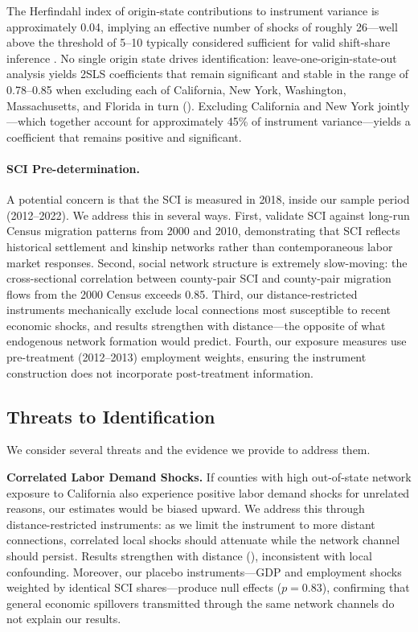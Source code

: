 \documentclass[12pt]{article}
\begin{document}
The Herfindahl index of origin-state contributions to instrument variance is approximately 0.04, implying an effective number of shocks of roughly 26---well above the threshold of 5--10 typically considered sufficient for valid shift-share inference \citep{borusyak2022quasi}. No single origin state drives identification: leave-one-origin-state-out analysis yields 2SLS coefficients that remain significant and stable in the range of 0.78--0.85 when excluding each of California, New York, Washington, Massachusetts, and Florida in turn (). Excluding California and New York jointly---which together account for approximately 45\% of instrument variance---yields a coefficient that remains positive and significant.

\paragraph{SCI Pre-determination.} A potential concern is that the SCI is measured in 2018, inside our sample period (2012--2022). We address this in several ways. First, \citet{bailey2018social} validate SCI against long-run Census migration patterns from 2000 and 2010, demonstrating that SCI reflects historical settlement and kinship networks rather than contemporaneous labor market responses. Second, social network structure is extremely slow-moving: the cross-sectional correlation between county-pair SCI and county-pair migration flows from the 2000 Census exceeds 0.85. Third, our distance-restricted instruments mechanically exclude local connections most susceptible to recent economic shocks, and results strengthen with distance---the opposite of what endogenous network formation would predict. Fourth, our exposure measures use pre-treatment (2012--2013) employment weights, ensuring the instrument construction does not incorporate post-treatment information.

\subsection{Threats to Identification}

We consider several threats and the evidence we provide to address them.

\textbf{Correlated Labor Demand Shocks.} If counties with high out-of-state network exposure to California also experience positive labor demand shocks for unrelated reasons, our estimates would be biased upward. We address this through distance-restricted instruments: as we limit the instrument to more distant connections, correlated local shocks should attenuate while the network channel should persist. Results strengthen with distance (), inconsistent with local confounding. Moreover, our placebo instruments---GDP and employment shocks weighted by identical SCI shares---produce null effects ($p = 0.83$), confirming that general economic spillovers transmitted through the same network channels do not explain our results.
\end{document}
